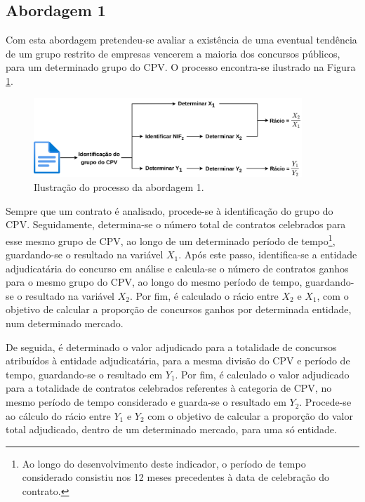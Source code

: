 


\subsection{Abordagem 1}

Com esta abordagem pretendeu-se avaliar a existência  de uma eventual tendência de um grupo restrito de empresas vencerem a maioria dos concursos públicos, para um determinado grupo do CPV. O processo encontra-se ilustrado na Figura \ref{fig:ab1}. 

\begin{figure}[H]
	\centering
	\includegraphics[width=0.9\textwidth]{imagens/r51/r51_v2.png}
	\caption{Ilustração do processo da abordagem 1.}
\label{fig:ab1}
\end{figure}

Sempre que um contrato é analisado, procede-se à identificação do grupo do CPV. Seguidamente, determina-se o número total de contratos celebrados para esse mesmo grupo de CPV, ao longo de um determinado período de tempo\footnote{Ao longo do desenvolvimento deste indicador, o período de tempo considerado consistiu nos 12 meses precedentes à data de celebração do contrato.}, guardando-se o resultado na variável $X_1$. Após este passo, identifica-se a entidade adjudicatária do concurso em análise e calcula-se o número de contratos ganhos para o mesmo grupo do CPV, ao longo do mesmo período de tempo, guardando-se o resultado na variável $X_2$. Por fim, é calculado o rácio entre $X_2$ e $X_1$, com o objetivo de calcular a proporção de concursos ganhos por determinada entidade, num determinado mercado. 

De seguida, é determinado o valor adjudicado para a totalidade de concursos atribuídos à entidade adjudicatária, para a mesma divisão do CPV e período de tempo, guardando-se o resultado em $Y_1$. Por fim, é calculado o valor adjudicado para a totalidade de contratos celebrados referentes à categoria de CPV, no mesmo período de tempo considerado e guarda-se o resultado em $Y_2$.  Procede-se ao cálculo do rácio entre $Y_1$ e $Y_2$ com o objetivo de calcular a proporção do valor total adjudicado, dentro de um determinado mercado, para uma só entidade. 

